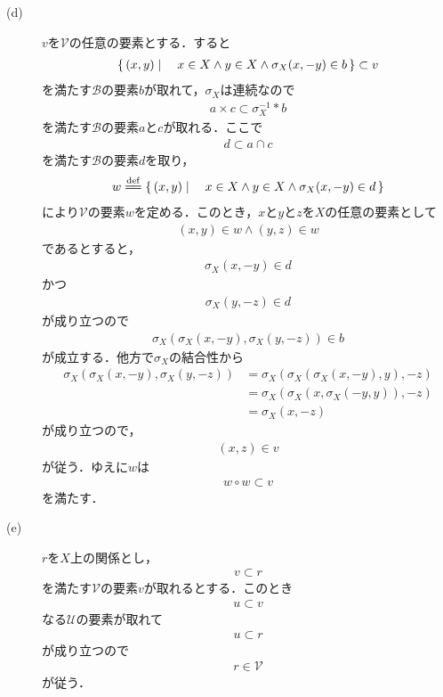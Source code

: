 \begin{description}
		\item[(d)] $v$を$\mathscr{V}$の任意の要素とする．すると
			\begin{align}
				\left\{\, (x,y) \mid \quad x \in X \wedge y \in X \wedge \sigma_X(x,-y) \in b\, \right\} \subset v
			\end{align}
			を満たす$\mathscr{B}$の要素$b$が取れて，$\sigma_X$は連続なので
			\begin{align}
				a \times c \subset \sigma_X^{-1} \ast b
			\end{align}
			を満たす$\mathscr{B}$の要素$a$と$c$が取れる．ここで
			\begin{align}
				d \subset a \cap c
			\end{align}
			を満たす$\mathscr{B}$の要素$d$を取り，
			\begin{align}
				w \defeq \Set{(x,y)}{x \in X \wedge y \in X \wedge \sigma_X(x,-y) \in d}
			\end{align}
			により$\mathscr{V}$の要素$w$を定める．このとき，$x$と$y$と$z$を$X$の任意の要素として
			\begin{align}
				(x,y) \in w \wedge (y,z) \in w
			\end{align}
			であるとすると，
			\begin{align}
				\sigma_X(x,-y) \in d
			\end{align}
			かつ
			\begin{align}
				\sigma_X(y,-z) \in d
			\end{align}
			が成り立つので
			\begin{align}
				\sigma_X\left(\sigma_X(x,-y),\sigma_X(y,-z)\right) \in b
			\end{align}
			が成立する．他方で$\sigma_X$の結合性から
			\begin{align}
				\sigma_X\left(\sigma_X(x,-y),\sigma_X(y,-z)\right)
				&= \sigma_X\left(\sigma_X\left(\sigma_X(x,-y),y\right),-z\right) \\
				&= \sigma_X\left(\sigma_X\left(x,\sigma_X(-y,y)\right),-z\right) \\
				&= \sigma_X(x,-z)
			\end{align}
			が成り立つので，
			\begin{align}
				(x,z) \in v
			\end{align}
			が従う．ゆえに$w$は
			\begin{align}
				w \circ w \subset v
			\end{align}
			を満たす．
			
		\item[(e)] $r$を$X$上の関係とし，
			\begin{align}
				v \subset r
			\end{align}
			を満たす$\mathscr{V}$の要素$v$が取れるとする．このとき
			\begin{align}
				u \subset v
			\end{align}
			なる$\mathscr{U}$の要素が取れて
			\begin{align}
				u \subset r
			\end{align}
			が成り立つので
			\begin{align}
				r \in \mathscr{V}
			\end{align}
			が従う．
			\QED
	\end{description}
